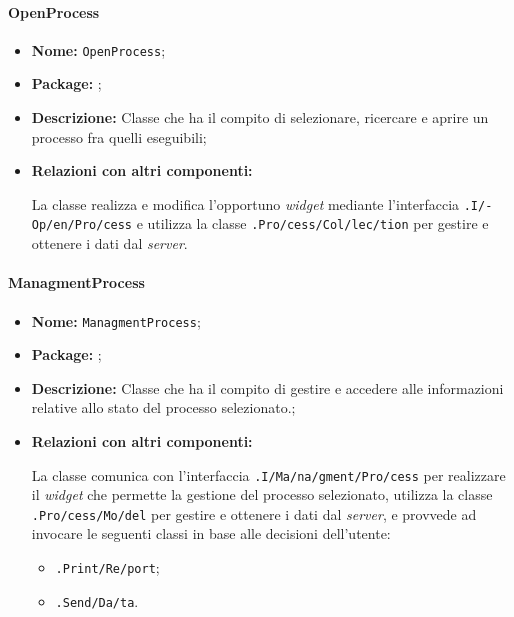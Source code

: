 \paragraph{OpenProcess}
\begin{flushleft}
\begin{itemize}
\item \textbf{Nome:} \texttt{OpenProcess};
\item \textbf{Package:} \texttt{\logicUser};
\item \textbf{Descrizione:} Classe che ha il compito di selezionare, ricercare e aprire un processo fra quelli eseguibili;
\item \textbf{Relazioni con altri componenti:}
\begin{sloppypar}
La classe realizza e modifica l'opportuno \textit{widget} mediante l'interfaccia \texttt{\viewUser{}.I\fshyp{}Op\fshyp{}en\fshyp{}Pro\fshyp{}cess} e utilizza la classe \texttt{\collection{}.Pro\fshyp{}cess\fshyp{}Col\fshyp{}lec\fshyp{}tion} per gestire e ottenere i dati dal \textit{server}.
\end{sloppypar}
\end{itemize}
\end{flushleft}

\paragraph{ManagmentProcess}
\begin{flushleft}
\begin{itemize}
\item \textbf{Nome:} \texttt{ManagmentProcess};
\item \textbf{Package:} \texttt{\logicUser};
\item \textbf{Descrizione:} Classe che ha il compito di gestire e accedere alle informazioni relative allo stato del processo selezionato.;
\item \textbf{Relazioni con altri componenti:}
\begin{sloppypar}
La classe comunica con l'interfaccia \texttt{\viewUser{}.I\fshyp{}Ma\fshyp{}na\fshyp{}gment\fshyp{}Pro\fshyp{}cess} per realizzare il \textit{widget} che permette la gestione del processo selezionato, utilizza la classe \texttt{\model{}.Pro\fshyp{}cess\fshyp{}Mo\fshyp{}del} per gestire e ottenere i dati dal \textit{server}, e provvede ad invocare le seguenti classi in base alle decisioni dell'utente:
\begin{itemize}
\item \texttt{\logicUser{}.Print\fshyp{}Re\fshyp{}port};
\item \texttt{\logicUser{}.Send\fshyp{}Da\fshyp{}ta}.
\end{itemize}
\end{sloppypar}
\end{itemize}
\end{flushleft}

